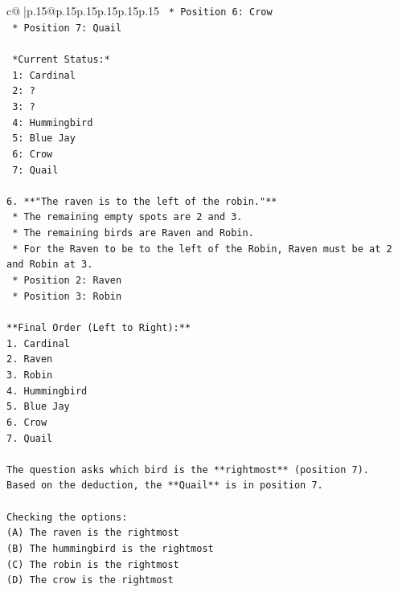 \documentclass{article}
\begin{document}
{\begin{supertabular}{c@{$\;$}|p{.15\linewidth}@{}p{.15\linewidth}p{.15\linewidth}p{.15\linewidth}p{.15\linewidth}p{.15\linewidth}}
{{{\texttt{    *   Position 6: Crow} \\
\texttt{    *   Position 7: Quail} \\
\\ 
\texttt{    *Current Status:*} \\
\texttt{    1: Cardinal} \\
\texttt{    2: ?} \\
\texttt{    3: ?} \\
\texttt{    4: Hummingbird} \\
\texttt{    5: Blue Jay} \\
\texttt{    6: Crow} \\
\texttt{    7: Quail} \\
\\ 
\texttt{6.  **"The raven is to the left of the robin."**} \\
\texttt{    *   The remaining empty spots are 2 and 3.} \\
\texttt{    *   The remaining birds are Raven and Robin.} \\
\texttt{    *   For the Raven to be to the left of the Robin, Raven must be at 2 and Robin at 3.} \\
\texttt{    *   Position 2: Raven} \\
\texttt{    *   Position 3: Robin} \\
\\ 
\texttt{**Final Order (Left to Right):**} \\
\texttt{1. Cardinal} \\
\texttt{2. Raven} \\
\texttt{3. Robin} \\
\texttt{4. Hummingbird} \\
\texttt{5. Blue Jay} \\
\texttt{6. Crow} \\
\texttt{7. Quail} \\
\\ 
\texttt{The question asks which bird is the **rightmost** (position 7).} \\
\texttt{Based on the deduction, the **Quail** is in position 7.} \\
\\ 
\texttt{Checking the options:} \\
\texttt{(A) The raven is the rightmost} \\
\texttt{(B) The hummingbird is the rightmost} \\
\texttt{(C) The robin is the rightmost} \\
\texttt{(D) The crow is the rightmost} \\
}}}
\end{supertabular}}
\end{document}
